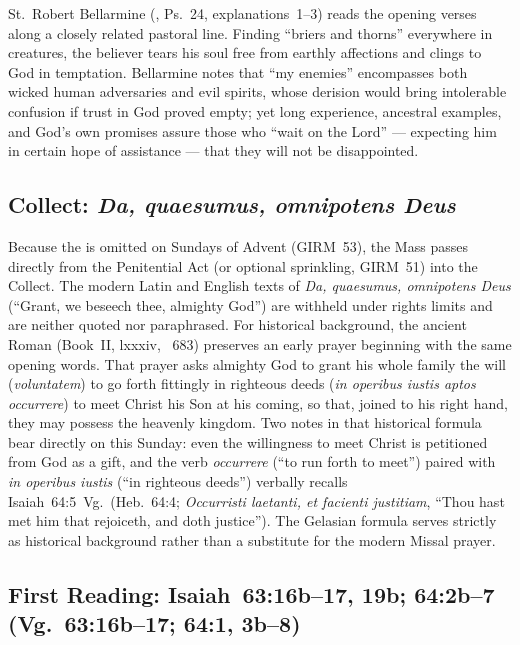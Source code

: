St.~Robert Bellarmine (, Ps.~24, explanations~1--3) reads the opening verses along a closely related pastoral line. Finding ``briers and thorns'' everywhere in creatures, the believer tears his soul free from earthly affections and clings to God in temptation. Bellarmine notes that ``my enemies'' encompasses both wicked human adversaries and evil spirits, whose derision would bring intolerable confusion if trust in God proved empty; yet long experience, ancestral examples, and God's own promises assure those who ``wait on the Lord'' --- expecting him in certain hope of assistance --- that they will not be disappointed.

\subsection{Collect: \emph{Da, quaesumus, omnipotens Deus}}

Because the  is omitted on Sundays of Advent (GIRM~53), the Mass passes directly from the Penitential Act (or optional sprinkling, GIRM~51) into the Collect. The modern Latin and English texts of \emph{Da, quaesumus, omnipotens Deus} (``Grant, we beseech thee, almighty God'') are withheld under rights limits and are neither quoted nor paraphrased. For historical background, the ancient Roman  (Book~II, lxxxiv, ~683) preserves an early prayer beginning with the same opening words. That prayer asks almighty God to grant his whole family the will (\emph{voluntatem}) to go forth fittingly in righteous deeds (\emph{in operibus iustis aptos occurrere}) to meet Christ his Son at his coming, so that, joined to his right hand, they may possess the heavenly kingdom. Two notes in that historical formula bear directly on this Sunday: even the willingness to meet Christ is petitioned from God as a gift, and the verb \emph{occurrere} (``to run forth to meet'') paired with \emph{in operibus iustis} (``in righteous deeds'') verbally recalls Isaiah~64:5~Vg.\ (Heb.~64:4; \emph{Occurristi laetanti, et facienti justitiam}, ``Thou hast met him that rejoiceth, and doth justice''). The Gelasian formula serves strictly as historical background rather than a substitute for the modern Missal prayer.

\subsection{First Reading: Isaiah~63:16b--17, 19b; 64:2b--7 (Vg.~63:16b--17; 64:1, 3b--8)}

